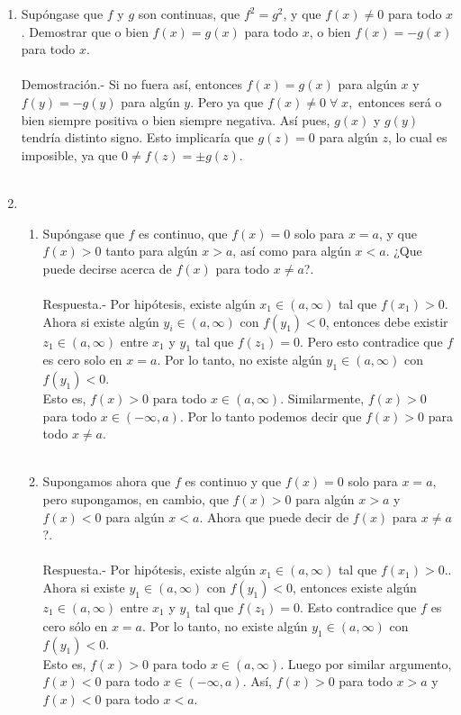 \begin{enumerate}
\item Supóngase que $f$ y $g$ son continuas, que $f^2=g^2$, y que $f(x)\neq 0$ para todo $x$. Demostrar que o bien $f(x)=g(x)$ para todo $x$, o bien $f(x)=-g(x)$ para todo $x$.\\\\
    Demostración.-\; Si no fuera así, entonces $f(x)=g(x)$ para algún $x$ y $f(y)=-g(y)$ para algún $y$. Pero ya que $f(x)\neq 0 \; \forall \;x,$ entonces será o bien siempre positiva o bien siempre negativa. Así pues, $g(x)$ y $g(y)$ tendría distinto signo. Esto implicaría que $g(z)=0$ para algún $z$, lo cual es imposible, ya que $0\neq f(z) = \pm g(z).$\\\\

\item 
    \begin{enumerate}[\bfseries (a)]

	\item Supóngase que $f$ es continuo, que $f(x)=0$ solo para $x=a$, y que $f(x)>0$ tanto para algún $x>a$, así como para algún $x<a$. ¿Que puede decirse acerca de $f(x)$ para todo $x\neq a$?.\\\\ 
	    Respuesta.-\; Por hipótesis, existe algún $x_1\in (a,\infty)$ tal que $f(x_1)>0$. Ahora si existe algún $y_i\in (a,\infty)$ con $f(y_1)<0$, entonces debe existir $z_1\in (a,\infty)$ entre $x_1$ y $y_1$ tal que $f(z_1)=0$. Pero esto contradice  que $f$ es cero solo en $x=a$. Por lo tanto, no existe algún $y_1\in (a,\infty)$ con $f(y_1)<0$.\\
	    Esto es, $f(x)>0$ para todo  $x\in(a,\infty).$ Similarmente, $f(x)>0$ para todo  $x\in(-\infty,a).$ Por lo tanto podemos decir que $f(x)>0$ para todo $x\neq a$.\\\\

	\item Supongamos ahora que $f$ es continuo y que $f(x)=0$ solo para $x=a$, pero supongamos, en cambio, que $f(x)>0$ para algún $x>a$ y $f(x)<0$ para algún $x<a$. Ahora que puede decir de $f(x)$ para $x\neq a$?.\\\\
	    Respuesta.-\; Por hipótesis, existe algún $x_1\in (a,\infty)$ tal que $f(x_1)>0.$. Ahora si existe $y_1\in (a,\infty)$ con $f(y_1)<0$, entonces existe algún $z_1\in (a,\infty)$ entre $x_1$ y $y_1$ tal que $f(z_1)=0.$ Esto contradice que $f$ es cero sólo en $x=a$. Por lo tanto, no existe algún $y_1\in (a,\infty)$ con $f(y_1)<0.$\\
	    Esto es, $f(x)>0$ para todo $x\in (a,\infty).$ Luego por similar argumento, $f(x)<0$ para todo $x\in (-\infty,a)$. Así, $f(x)>0$ para todo $x>a$ y $f(x)<0$ para todo $x<a$.\\\\


\end{enumerate}
\end{enumerate}

